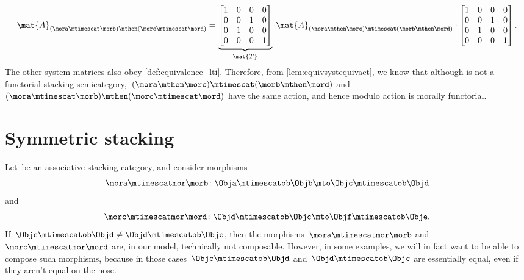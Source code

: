 \begin{example}
    \begin{equation}
        \mat{A}_{(\mora\mtimescat \morb)\mthen (\morc\mtimescat \mord)}=
        \underbrace{\begin{bmatrix}
                1 & 0 & 0 & 0 \\
                0 & 0 & 1 & 0 \\
                0 & 1 & 0 & 0 \\
                0 & 0 & 0 & 1
            \end{bmatrix}}_{\mat{T}}\cdot
        \mat{A}_{(\mora \mthen \morc)\mtimescat (\morb\mthen \mord)}
        \cdot
        \begin{bmatrix}
            1 & 0 & 0 & 0 \\
            0 & 0 & 1 & 0 \\
            0 & 1 & 0 & 0 \\
            0 & 0 & 0 & 1
        \end{bmatrix}.
    \end{equation}
    The other system matrices also obey \cref{def:equivalence_lti}.
    Therefore, from \cref{lem:equivsystequivact}, we know that although \LTI is not a functorial stacking semicategory,~$(\mora \mthen \morc)\mtimescat (\morb\mthen \mord)$ and~$(\mora\mtimescat \morb)\mthen (\morc\mtimescat \mord)$ have the same action, and hence \LTI modulo action is morally functorial.
\end{example}

\section{Symmetric stacking}

Let~\CatC be an associative stacking category, and consider morphisms
\begin{equation}
    \mora \mtimescatmor \morb \colon \Obja \mtimescatob \Objb \mto \Objc \mtimescatob \Objd
\end{equation}
and
\begin{equation}
    \morc \mtimescatmor \mord \colon \Objd \mtimescatob \Objc \mto \Objf \mtimescatob \Obje.
\end{equation}
If~$\Objc \mtimescatob \Objd \neq \Objd \mtimescatob \Objc$, then the morphisms~$\mora \mtimescatmor \morb$ and~$\morc \mtimescatmor \mord$ are, in our model, technically not composable.
However, in some examples, we will in fact want to be able to compose such morphisms, because in those cases~$\Objc \mtimescatob \Objd$ and~$\Objd \mtimescatob \Objc$ are essentially equal, even if they aren't equal on the nose.

